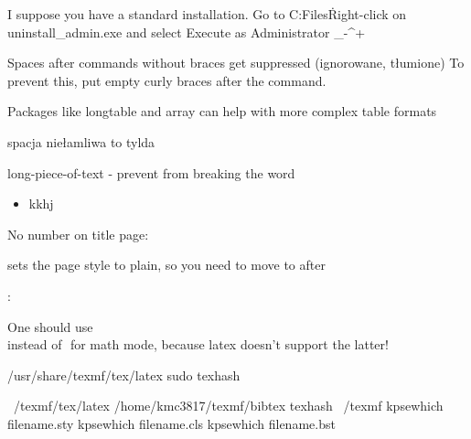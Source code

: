 \def\cthesissetcolorbluegreen{%
	\cthesissetcolor{cmyk}{.61, .47, .03, 0}{.48, .05, .91, 0}%
}










I suppose you have a standard installation. Go to C:\Program Files\miktex\bin{}\internal\. 
Right-click on uninstall_admin.exe and select Execute as Administrator
%
\int\limits_{-\infty}^{+\infty}

\iffalse
I don't want this to appear
\fi





Spaces after commands without braces get suppressed (ignorowane, tłumione)
To  prevent  this,  put  empty  curly  braces  after  the  command.


Packages like longtable and array
can help with
more complex table formats

spacja niełamliwa to tylda ~

\mbox{long-piece-of-text}   - prevent from breaking the word

\begin{itemize}
\item[] kkhj %
\end{itemize}


No number on title page:
\maketitle sets the page style to plain, so you need to move \thispagestyle{empty} to after \maketitle:




One should use \[ \] instead of $ $ for math mode, because latex doesn't support the latter!

/usr/share/texmf/tex/latex  
sudo texhash

~/texmf/tex/latex
/home/kmc3817/texmf/bibtex
texhash ~/texmf
kpsewhich filename.sty
kpsewhich filename.cls
kpsewhich filename.bst
